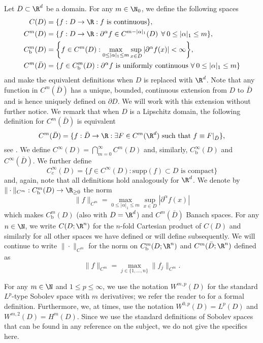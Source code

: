 Let \(D \subset \R^d\) be a domain. For any \(m \in \N_0\), we define the following spaces
\begin{align*}
C (D) &=  \{f : D \to \R : f \text{ is continuous}\}, \\
C^m (D) & = \{f : D \to \R : \partial^\alpha f \in C^{m - |\alpha|_1}(D) \:\: \forall \: 0 \leq |\alpha|_1 \leq m\}, \\
C^m_{\text{b}}(D) &= \bigg \{f \in C^m (D) : \max_{0 \leq |\alpha|_1 \leq m} \sup_{x \in D} |\partial^\alpha f (x)| < \infty \bigg\}, \\
C^m (\bar{D}) &= \{f \in C^m_{\text{b}}(D) : \partial^\alpha f \text{ is uniformly continuous } \forall \: 0 \leq |\alpha|_1 \leq m \}
\end{align*}
and make the equivalent definitions when \(D\) is replaced with \(\R^d\). Note that any function in \(C^m (\bar{D})\)
has a unique, bounded, continuous extension from \(D\) to \(\bar{D}\) and is hence uniquely defined on \(\partial D\).
We will work with this extension without further notice. We remark that 
when \(D\) is a Lipschitz domain, the following definition for \(C^m (\bar{D})\) is equivalent
\[C^m (\bar{D}) = \{f : \bar{D} \to \R : \exists F \in C^m(\R^d) \text{ such that } f \equiv F|_{\bar{D}} \},\]
see \cite{whitney1934functions,brudnyi2012methods}. We define \(C^\infty (D) = \bigcap_{m=0}^\infty C^m (D)\) and, similarly, \(C^\infty_{\text{b}}(D)\) and \(C^\infty (\bar{D})\).
We further define
\[C^\infty_c (D) = \{f \in C^\infty (D) : \text{supp}(f) \subset D \text{ is compact}\}\]
and, again, note that all definitions hold analogously for \(\R^d\).
We denote by \(\|\cdot\|_{C^m} : C^m_{\text{b}}(D) \to \R_{\geq 0}\) the norm
\[\|f\|_{C^m} = \max_{0 \leq |\alpha|_1 \leq m} \sup_{x \in D} |\partial^\alpha f (x)|\]
which makes \(C^m_{\text{b}}(D)\) (also with \(D = \R^d\)) and \(C^m (\bar{D})\) Banach spaces.
For any \(n \in \N\), we write \(C(D;\R^n)\) for the \(n\)-fold Cartesian 
product of \(C(D)\) and similarly for all other spaces we have defined or will
define subsequently. We will
continue to write \(\|\cdot\|_{C^m}\) for the norm on \(C^m_{\text{b}}(D;\R^n)\)
and \(C^m(\bar{D};\R^n)\) defined as
\[\|f\|_{C^m} = \max_{j \in \{1,\dots,n\}} \|f_j\|_{C^m}.\]

For any \(m \in \N\) and \(1 \leq p \leq \infty\), we use the notation \(W^{m,p}(D)\) for the
standard \(L^p\)-type Sobolev space with \(m\) derivatives; we refer the reader to \cite{adams2003sobolev} for a formal definition. Furthermore, we, at times, use the notation \(W^{0,p}(D) = L^p(D)\) and \(W^{m,2}(D) = H^m (D)\). Since we use the standard definitions of Sobolev spaces that can be found in any reference on the subject, we do not give the specifics here.

